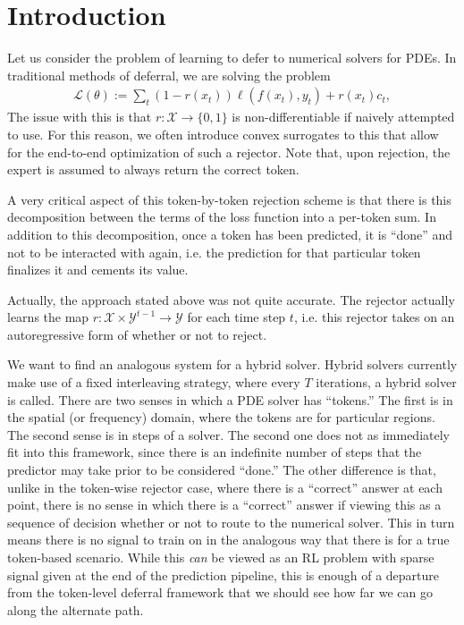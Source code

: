 \documentclass[12pt]{article}
\begin{document}
	\MakeScribeTop

\section{Introduction} \label{sec:intro}
Let us consider the problem of learning to defer to numerical solvers for PDEs. In traditional methods of deferral, we are solving the problem
\begin{align*}
    \mathcal{L}(\theta) 
    := \sum_t (1 - r(x_t)) \ell(f(x_t), y_t) + r(x_t) c_t,
\end{align*}
The issue with this is that $r : \mathcal{X}\to\{0,1\}$ is non-differentiable if naively attempted to use. For this reason, we often introduce convex surrogates to this that allow for the end-to-end optimization of such a rejector. Note that, upon rejection, the expert is assumed to always return the correct token. 

A very critical aspect of this token-by-token rejection scheme is that there is this decomposition between the terms of the loss function into a per-token sum. In addition to this decomposition, once a token has been predicted, it is ``done'' and not to be interacted with again, i.e. the prediction for that particular token finalizes it and cements its value. 

Actually, the approach stated above was not quite accurate. The rejector actually learns the map $r : \mathcal{X} \times \mathcal{Y}^{t-1}\to\mathcal{Y}$ for each time step $t$, i.e. this rejector takes on an autoregressive form of whether or not to reject.

We want to find an analogous system for a hybrid solver. Hybrid solvers currently make use of a fixed interleaving strategy, where every $T$ iterations, a hybrid solver is called. There are two senses in which a PDE solver has ``tokens.'' The first is in the spatial (or frequency) domain, where the tokens are for particular regions. The second sense is in steps of a solver. The second one does not as immediately fit into this framework, since there is an indefinite number of steps that the predictor may take prior to be considered ``done.'' The other difference is that, unlike in the token-wise rejector case, where there is a ``correct'' answer at each point, there is no sense in which there is a ``correct'' answer if viewing this as a sequence of decision whether or not to route to the numerical solver. This in turn means there is no signal to train on in the analogous way that there is for a true token-based scenario. While this \textit{can} be viewed as an RL problem with sparse signal given at the end of the prediction pipeline, this is enough of a departure from the token-level deferral framework that we should see how far we can go along the alternate path. 
\end{document}
